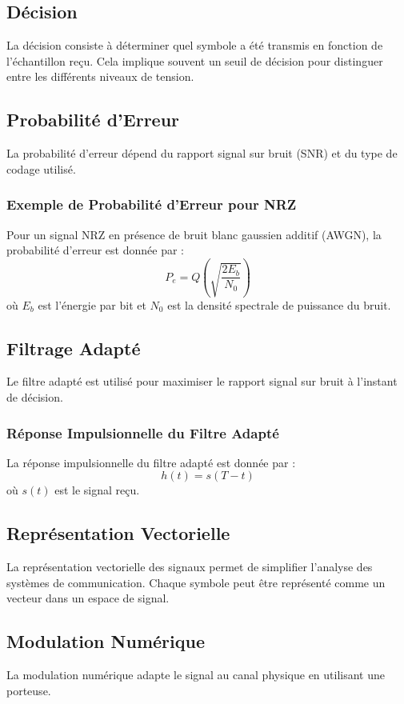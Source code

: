 \documentclass[10pt,a4paper]{article}
\begin{document}
\subsection*{Décision}
La décision consiste à déterminer quel symbole a été transmis en fonction de l'échantillon reçu. Cela implique souvent un seuil de décision pour distinguer entre les différents niveaux de tension.

\subsection*{Probabilité d'Erreur}
La probabilité d'erreur dépend du rapport signal sur bruit (SNR) et du type de codage utilisé.

\subsubsection*{Exemple de Probabilité d'Erreur pour NRZ}
Pour un signal NRZ en présence de bruit blanc gaussien additif (AWGN), la probabilité d'erreur est donnée par :
\[ P_e = Q\left(\sqrt{\frac{2E_b}{N_0}}\right) \]
où \(E_b\) est l'énergie par bit et \(N_0\) est la densité spectrale de puissance du bruit.

\subsection*{Filtrage Adapté}
Le filtre adapté est utilisé pour maximiser le rapport signal sur bruit à l'instant de décision.

\subsubsection*{Réponse Impulsionnelle du Filtre Adapté}
La réponse impulsionnelle du filtre adapté est donnée par :
\[ h(t) = s(T - t) \]
où \(s(t)\) est le signal reçu.

\subsection*{Représentation Vectorielle}
La représentation vectorielle des signaux permet de simplifier l'analyse des systèmes de communication. Chaque symbole peut être représenté comme un vecteur dans un espace de signal.

\subsection*{Modulation Numérique}
La modulation numérique adapte le signal au canal physique en utilisant une porteuse.
\end{document}

